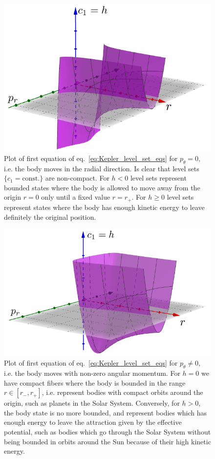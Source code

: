 \documentclass[main.tex]{subfiles}
\begin{document}
\begin{example}
\begin{enumerate}
		\vspace{-0.5cm}
		\begin{figure}[H]
			\centering
			\includegraphics[width=.6\textwidth]{figures/Kepler_c2_0.png}
			\caption{Plot of first equation of eq.~\eqref{eq:Kepler_level_set_eqs} for $p_\theta = 0$, i.e. the body moves in the radial direction. Is clear that level sets $\{c_1 = \text{const.}\}$ are non-compact. For $h < 0$ level sets represent bounded states where the body is allowed to move away from the origin $r = 0$ only until a fixed value $r = r_+$. For $h \geq 0$  level sets represent states where the body has enough kinetic energy to leave definitely the original position.}
			\label{fig:Kepler_c2_0}
		\end{figure}
		\vspace{-0.5cm}
		\begin{figure}[H]
			\centering
			\includegraphics[width=.6\textwidth]{figures/Kepler_c2_neq_0.png}
			\caption{Plot of first equation of eq.~\eqref{eq:Kepler_level_set_eqs} for $p_\theta \neq 0$, i.e. the body moves with non-zero angular momentum. For $h = 0$ we have compact fibers where the body is bounded in the range $r \in [r_-, r_+]$, i.e. represent bodies with compact orbits around the origin, such as planets in the Solar System. Conversely, for $h > 0$, the body state is no more bounded, and represent bodies which has enough energy to leave the attraction given by the effective potential, such as bodies which go through the Solar System without being bounded in orbits around the Sun because of their high kinetic energy.}

\end{figure}
\end{enumerate}
\end{example}
\end{document}
